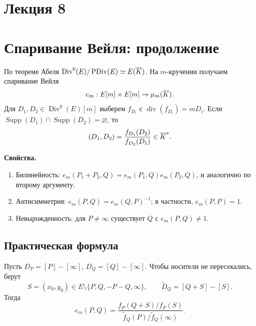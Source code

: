 \documentclass[12pt,a4paper]{article}
\newcommand{\Div}{\operatorname{Div}}\newcommand{\PDiv}{\operatorname{PDiv}}\newcommand{\ord}{\operatorname{ord}}\newcommand{\Supp}{\operatorname{Supp}}
\begin{document}
\section*{\centering Лекция 8}
\section{Спаривание Вейля: продолжение}
По теореме Абеля $\Div^0(E)/\PDiv(E)\simeq E(\Kbar)$. На $m$-кручении получаем спаривание Вейля
\[e_m:E[m]\times E[m]\to\mu_m(\overline K).\]
Для $D_1,D_2\in\Div^0(E)[m]$ выберем $f_{D_i}$ с $\operatorname{div}(f_{D_i})=mD_i$. Если $\Supp(D_1)\cap\Supp(D_2)=\varnothing$, то
\[(D_1,D_2)=\frac{f_{D_1}(D_2)}{f_{D_2}(D_1)}\in\overline K^*.\]

\textbf{Свойства.}
\begin{enumerate}[label=\arabic*)]
\item Билинейность: $e_m(P_1+P_2,Q)=e_m(P_1,Q)e_m(P_2,Q)$, и аналогично по второму аргументу.
\item Антисимметрия: $e_m(P,Q)=e_m(Q,P)^{-1}$; в частности, $e_m(P,P)=1$.
\item Невырожденность: для $P\ne\infty$ существует $Q$ с $e_m(P,Q)\ne1$.
\end{enumerate}

\subsection*{Практическая формула}
Пусть $D_P=[P]-[\infty]$, $D_Q=[Q]-[\infty]$. Чтобы носители не пересекались, берут
\[S=(x_0,y_0)\in E\setminus\{P,Q,-P-Q,\infty\},\qquad \widetilde D_Q=[Q+S]-[S].\]
Тогда
\[e_m(P,Q)=\frac{f_P(Q+S)/f_P(S)}{\widetilde f_Q(P)/\widetilde f_Q(\infty)}.\]
\end{document}
